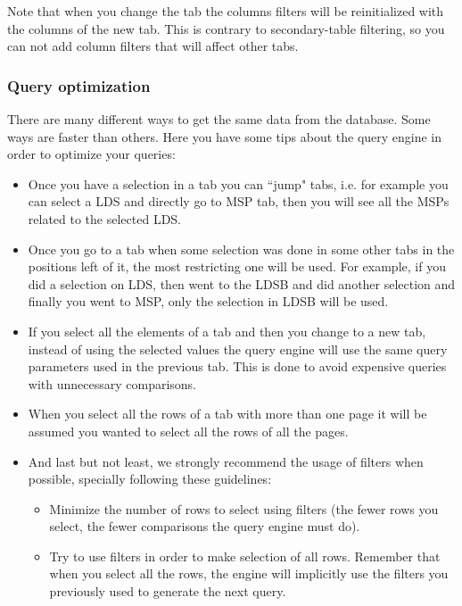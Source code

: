 \documentclass[a4paper,11pt]{article}
\begin{document}
Note that when you change the tab the columns filters will be reinitialized with the columns of the new tab. This is contrary to secondary-table filtering, so you can not add column filters that will affect other tabs.

\subsubsection{Query optimization}
\label{sec:queryengine}

There are many different ways to get the same data from the database. Some ways are faster than others. Here you have some tips about the query engine in order to optimize your queries:

\begin{itemize}
	\item Once you have a selection in a tab you can ``jump" tabs, i.e. for example you can select a LDS and directly go to MSP tab, then you will see all the MSPs related to the selected LDS. 

	\item Once you go to a tab when some selection was done in some other tabs in the positions left of it, the most restricting one will be used. For example, if you did a selection on LDS, then went to the LDSB and did another selection and finally you went to MSP, only the selection in LDSB will be used.

	\item If you select all the elements of a tab and then you change to a new tab, instead of using the selected values the query engine will use the same query parameters used in the previous tab. This is done to avoid expensive queries with unnecessary comparisons.

	\item When you select all the rows of a tab with more than one page it will be assumed you wanted to select all the rows of all the pages.

	\item And last but not least, we strongly recommend the usage of filters when possible, specially following these guidelines:
	\begin{itemize}
		\item Minimize the number of rows to select using filters (the fewer rows you select, the fewer comparisons the query engine must do).
		
		\item Try to use filters in order to make selection of all rows. Remember that when you select all the rows, the engine will implicitly use the filters you previously used to generate the next query.
		

\end{itemize}
\end{itemize}
\end{document}
